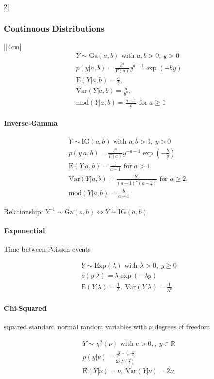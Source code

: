 \documentclass[8pt]{extarticle}
\begin{document}
\begin{multicols}{2}[\subsubsection{Continuous Distributions}][4cm]
    \begin{align*}
    & Y \sim \mathrm{Ga}(a, b) \text{ with } a,b > 0,\: y > 0\\
    & p(y|a, b) = \frac{ b^a }{\Gamma (a)} y^{a-1} \exp (-by) \\
    & \mathrm{E}(Y|a, b) = \frac{a}{b},\\
    & \mathrm{Var}(Y|a, b) = \frac{a}{b^a}, \\
    & \mathrm{mod}(Y|a, b) = \frac{a-1}{b} \text{ for } a \ge 1
  \end{align*}

  	\paragraph{Inverse-Gamma}
  
    \begin{align*}
    & Y \sim \mathrm{IG}(a, b) \text{ with } a,b > 0,\: y > 0\\
    & p(y|a, b) = \frac{ b^a }{\Gamma (a)} y^{-a-1} \exp (-\frac{b}{y}) \\
    & \mathrm{E}(Y|a, b) = \frac{b}{a-1} \text{ for } a > 1,\\
    & \mathrm{Var}(Y|a, b) = \frac{b^2}{(a-1)^2(a-2)} \text{ for } a \ge 2, \\
    & \mathrm{mod}(Y|a, b) = \frac{b}{a+1}
  \end{align*}
  
\noindent Relationship: $Y^{-1} \sim \mathrm{Ga}(a, b) \Leftrightarrow Y \sim \mathrm{IG}(a, b)$
  
  
  	\paragraph{Exponential} Time between Poisson events
  
    \begin{align*}
    & Y \sim \mathrm{Exp}(\lambda) \text{ with } \lambda > 0,\: y \geq 0\\
    & p(y|\lambda) = \lambda\exp (-\lambda y) \\
    & \mathrm{E}(Y|\lambda) = \frac{1}{\lambda}, \:
	\mathrm{Var}(Y|\lambda) = \frac{1}{\lambda^2}
  \end{align*}
  
  
  	\paragraph{Chi-Squared} squared standard normal random variables with $\nu$ degrees of freedom
  
    \begin{align*}
    & Y \sim \chi^2(\nu) \text{ with } \nu > 0,,\: y \in \mathbb{R}\\
    & p(y|\nu) = \frac{y^{\frac{\nu}{2}-1}e^{-\frac{y}{2}}}{2^{\frac{\nu}{2}}\Gamma \left(\frac{\nu}{2}\right)} \\
    & \mathrm{E}(Y|\nu) = \nu, \:
	\mathrm{Var}(Y|\nu) = 2\nu
  \end{align*}

\end{multicols}
\end{document}
